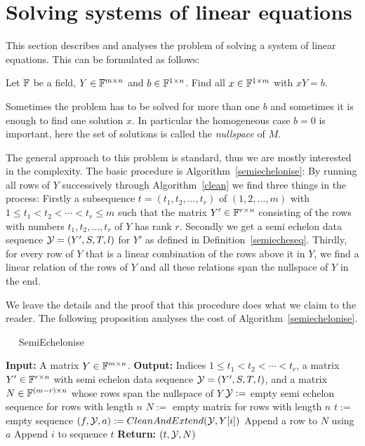 \section{Solving systems of linear equations}
\label{sec:syslineq}

This section describes and analyses the problem of solving a system
of linear equations. This can be formulated as follows:

Let $\mathbb{F}$ be a field, $Y \in \mathbb{F}^{m \times n}$ and $b \in \mathbb{F}^{1 \times n}$.
Find all $x \in \mathbb{F}^{1 \times m}$ with $xY = b$.

Sometimes the problem has to be solved for more than one $b$ and sometimes
it is enough to find one solution $x$. In particular the homogeneous case 
$b=0$ is important, here the set of solutions is called the \emph{nullspace}
of $M$.

The general approach to this problem is standard, thus we are mostly
interested in the complexity. The basic procedure is
Algorithm~\ref{semiechelonise}: By running
all rows of $Y$ successively through Algorithm~\ref{clean} we
find three things in the process: Firstly a subsequence
$t=(t_1,t_2, \ldots, t_{r})$ of $(1,2,\ldots, m)$ with
$1 \le t_1 < t_2 < \cdots < t_r \le m$ such that the matrix
$Y' \in \mathbb{F}^{r \times n}$ consisting of the rows with numbers 
$t_1, t_2, \ldots, t_r$ of $Y$ has rank $r$. Secondly we get a
semi echelon data sequence $\mathcal{Y} = (Y',S,T,l)$ for $Y'$ as defined
in Definition~\ref{semiecheseq}. Thirdly, for every row of $Y$ that
is a linear combination of the rows above it in $Y$, we find a linear 
relation of the rows of $Y$ and all these relations span the nullspace
of $Y$ in the end.

We leave the details and the proof that this procedure does what
we claim to the reader. The following proposition analyses the cost
of Algorithm~\ref{semiechelonise}.

\begin{algorithm}
\caption{$\quad$ \sc SemiEchelonise}
\label{semiechelonise}
\begin{algorithmic}
\STATE \textbf{Input:} A matrix $Y \in \mathbb{F}^{m \times n}$.
\STATE \textbf{Output:} Indices $1 \le t_1 < t_2 < \cdots < t_r$,
a matrix $Y' \in \mathbb{F}^{r \times n}$ with semi echelon data sequence
\STATE \mbox{}
$\mathcal{Y} = (Y',S,T,l)$, and a matrix $N \in \mathbb{F}^{(m-r) \times n}$
whose rows span the nullspace of $Y$
\STATE $\mathcal{Y} := $ empty semi echelon sequence for rows with length $n$
\STATE $N := $ empty matrix for rows with length $n$
\STATE $t := $ empty sequence
    \STATE $(f,\calY,a) := \textsc{CleanAndExtend}(\calY,Y[i])$
        \STATE Append a row to $N$ using $a$
    \ELSE
        \STATE Append $i$ to sequence $t$
    \ENDIF
\ENDFOR
\STATE \textbf{Return:} $(t,\mathcal{Y},N)$
\end{algorithmic}
\end{algorithm}

